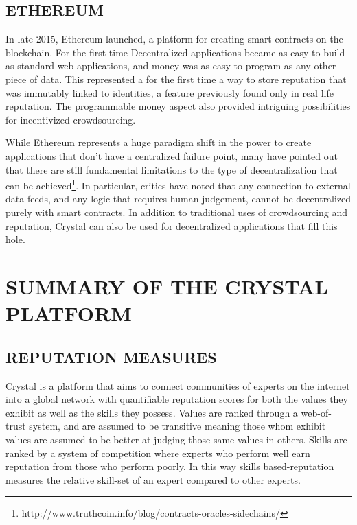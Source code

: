\subsection{ETHEREUM}\label{ethereum}

In late 2015, Ethereum launched, a platform for creating smart contracts
on the blockchain. For the first time Decentralized applications became
as easy to build as standard web applications, and money was as easy to
program as any other piece of data. This represented a for the first
time a way to store reputation that was immutably linked to identities,
a feature previously found only in real life reputation. The
programmable money aspect also provided intriguing possibilities for
incentivized crowdsourcing.

While Ethereum represents a huge paradigm shift in the power to create
applications that don't have a centralized failure point, many have
pointed out that there are still fundamental limitations to the type of
decentralization that can be achieved\footnote{http://www.truthcoin.info/blog/contracts-oracles-sidechains/}.
In particular, critics have noted that any connection to external data
feeds, and any logic that requires human judgement, cannot be
decentralized purely with smart contracts. In addition to traditional
uses of crowdsourcing and reputation, Crystal can also be used for
decentralized applications that fill this hole.

\section{\texorpdfstring{\protect\hypertarget{_46tblw4991ix}{}{\protect\hypertarget{_Toc462050402}{}{}}SUMMARY
OF THE CRYSTAL
PLATFORM}{SUMMARY OF THE CRYSTAL PLATFORM}}\label{summary-of-the-crystal-platform}

\subsection{\texorpdfstring{\protect\hypertarget{_fd2e9lhrqplf}{}{\protect\hypertarget{_Toc462050403}{}{}}REPUTATION
MEASURES}{REPUTATION MEASURES}}\label{reputation-measures}

Crystal is a platform that aims to connect communities of experts on the
internet into a global network with quantifiable reputation scores for
both the values they exhibit as well as the skills they possess. Values
are ranked through a web-of-trust system, and are assumed to be
transitive meaning those whom exhibit values are assumed to be better at
judging those same values in others. Skills are ranked by a system of
competition where experts who perform well earn reputation from those
who perform poorly. In this way skills based-reputation measures the
relative skill-set of an expert compared to other experts.

